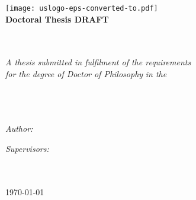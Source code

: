 \pagestyle{empty}
	\begin{center}

		\texttt{[image: uslogo-eps-converted-to.pdf]}\\[1cm]%
		\textbf{\Large Doctoral Thesis DRAFT}

		\Huge \textbf{\myTitle}\\[0.5cm] %
        \large \textbf{\mySubtitle}\\[2cm]
		\large \textit{A thesis submitted in fulfilment of the requirements\\ for the degree of Doctor of Philosophy} %
		\textit{in the}\\[1.5cm]
		\myDepartment\\ \myFaculty\\ \myUni\\[1cm]
	
		\begin{minipage}{.45\linewidth}
			\begin{flushleft} %
			\emph{Author:}\\
			{\myName}
			\newline
			\newline
			\end{flushleft}
		\end{minipage}
		\hfill
		\begin{minipage}{.45\linewidth}
			\begin{flushright} %
			\emph{Supervisors:} \\
			\myFirstSupervisor \\%
			\mySecondSupervisor \\%
			\myThirdSupervisor %
			\end{flushright}
		\end{minipage}

		\vfill
		\large \today
		 
	\end{center}
